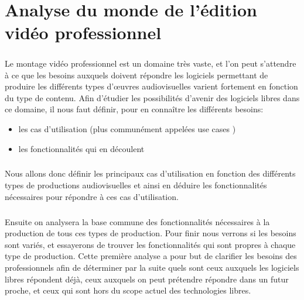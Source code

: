 \chapter {Analyse du monde de l'édition vidéo professionnel}

\minitoc \mtcskip \newpage


\paragraph{}

Le montage vidéo professionnel est un domaine très vaste, et l'on peut
s'attendre à ce que les besoins auxquels doivent répondre les logiciels
permettant de produire les différents types d'œuvres audiovisuelles
varient fortement en fonction du type de contenu. Afin d'étudier les
possibilités d'avenir des logiciels libres dans ce domaine, il nous
faut définir, pour en connaître les différents besoins:

\begin{itemize} \setlength{\itemsep}{2mm}

  \item {les cas d'utilisation (plus communément appelées use cases
    )}

  \item {les fonctionnalités qui en découlent}

\end{itemize}


\paragraph{}

Nous allons donc définir les principaux cas d'utilisation en fonction
des différents types de productions audiovisuelles et ainsi en déduire
les fonctionnalités nécessaires pour répondre à ces cas d'utilisation.

\paragraph{}

Ensuite on analysera la base commune des fonctionnalités nécessaires à
la production de tous ces types de production.  Pour finir nous verrons si
les besoins sont variés, et essayerons de trouver les fonctionnalités
qui sont propres à chaque type de production. Cette première analyse a
pour but de clarifier les besoins des professionnels afin de déterminer
par la suite quels sont ceux auxquels les logiciels libres répondent
déjà, ceux auxquels on peut prétendre répondre dans un futur proche,
et ceux qui sont hors du scope actuel des technologies libres.

